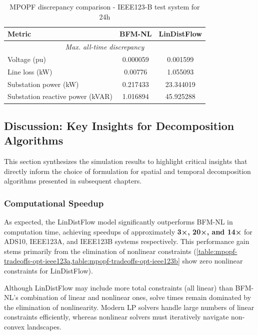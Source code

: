 \begin{table}[H]
    \centering
    \caption{MPOPF discrepancy comparison - IEEE123-B test system for 24h}
    \label{table:mpopf-tradeoffs-feas-ieee123b}
    \begin{tabular}{|l|c|c|}
    \hline
    \textbf{Metric} & \textbf{BFM-NL} & \textbf{LinDistFlow} \\ \hline
    \multicolumn{3}{|c|}{\textit{Max. all-time discrepancy}} \\ \hline
    Voltage (pu) & 0.000059 & 0.001599 \\ \hline
    Line loss (kW) & 0.00776 & 1.055093 \\ \hline
    Substation power (kW) & 0.217433 & 23.344019 \\ \hline
    Substation reactive power (kVAR) & 1.016894 & 45.925288 \\ \hline
    \end{tabular}
\end{table}

\subsection{Discussion: Key Insights for Decomposition Algorithms}

This section synthesizes the simulation results to highlight critical insights that directly inform the choice of formulation for spatial and temporal decomposition algorithms presented in subsequent chapters.

\subsubsection{Computational Speedup}

As expected, the LinDistFlow model significantly outperforms BFM-NL in computation time, achieving speedups of approximately \textbf{3×, 20×, and 14×} for ADS10, IEEE123A, and IEEE123B systems respectively. This performance gain stems primarily from the elimination of nonlinear constraints (\cref{table:mpopf-tradeoffs-opt-ieee123a,table:mpopf-tradeoffs-opt-ieee123b} show zero nonlinear constraints for LinDistFlow).

Although LinDistFlow may include more total constraints (all linear) than BFM-NL's combination of linear and nonlinear ones, solve times remain dominated by the elimination of nonlinearity. Modern LP solvers handle large numbers of linear constraints efficiently, whereas nonlinear solvers must iteratively navigate non-convex landscapes.


